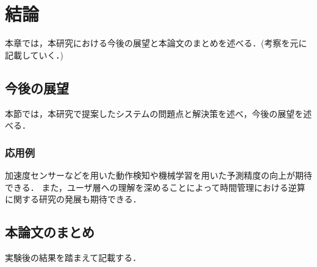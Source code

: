 \chapter{結論}
本章では，本研究における今後の展望と本論文のまとめを述べる．(考察を元に記載していく．)
\section{今後の展望}
本節では，本研究で提案したシステムの問題点と解決策を述べ，今後の展望を述べる．

\subsection{応用例}
加速度センサーなどを用いた動作検知や機械学習を用いた予測精度の向上が期待できる．
また，ユーザ層への理解を深めることによって時間管理における逆算に関する研究の発展も期待できる．
\section{本論文のまとめ}
実験後の結果を踏まえて記載する．